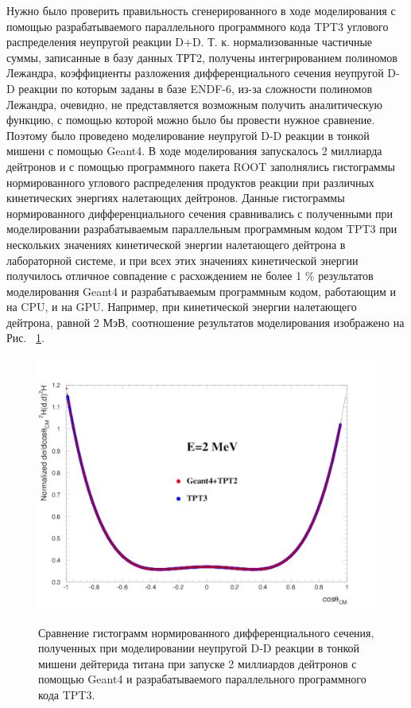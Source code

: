 \documentclass[a4paper,12pt]{article}
\begin{document}
\begin{large}
	Нужно было проверить правильность сгенерированного в ходе моделирования с помощью разрабатываемого параллельного программного кода TPT3 углового распределения неупругой реакции D+D.
	Т. к. нормализованные частичные суммы, записанные в базу данных ТРТ2, получены интегрированием полиномов Лежандра, коэффициенты разложения дифференциального сечения неупругой D-D реакции по которым заданы в базе ENDF-6, из-за сложности полиномов Лежандра, очевидно, не представляется возможным получить аналитическую функцию, с помощью которой можно было бы провести нужное сравнение.
	Поэтому было проведено моделирование неупругой D-D реакции в тонкой мишени с помощью Geant4.
	В ходе моделирования запускалось 2 миллиарда дейтронов и с помощью программного пакета ROOT заполнялись гистограммы нормированного углового распределения продуктов реакции при различных кинетических энергиях налетающих дейтронов.
	Данные гистограммы нормированного дифференциального сечения сравнивались с полученными при моделировании разрабатываемым параллельным программным кодом TPT3 при нескольких значениях кинетической энергии налетающего дейтрона в лабораторной системе, и при всех этих значениях кинетической энергии получилось отличное совпадение с расхождением не более 1 \% результатов моделирования Geant4 и разрабатываемым программным кодом, работающим и на CPU, и на GPU.
	Например, при кинетической энергии налетающего дейтрона, равной 2 МэВ, соотношение результатов моделирования изображено на  Рис. ~\ref{fig:ValidationThermonuclear2mev2billionParticles}.
	
\begin{figure}[ht]
  {
     \includegraphics[width=0.99\linewidth]{images/validation_thermonuclear_2mev_2billion.pdf}
  }
  \caption{Сравнение гистограмм нормированного дифференциального сечения, полученных при моделировании неупругой D-D реакции в тонкой мишени дейтерида титана при запуске 2 миллиардов дейтронов с помощью Geant4 и разрабатываемого параллельного программного кода TPT3.}
  \label{fig:ValidationThermonuclear2mev2billionParticles}
\end{figure}	
	

\end{large}
\end{document}
